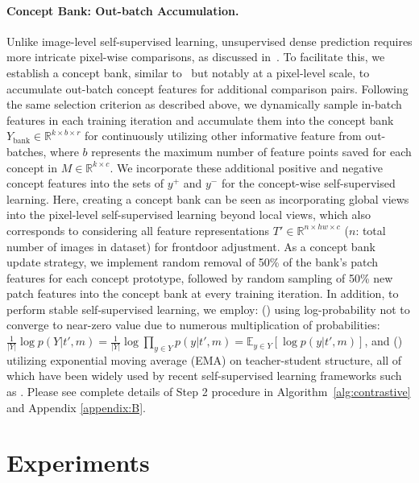 \documentclass{article} \usepackage{iclr2024_conference,times}
\newcommand{\E}{\mathbb{E}}
\begin{document}
\paragraph{Concept Bank: Out-batch Accumulation.} Unlike image-level self-supervised learning, unsupervised dense prediction requires more intricate pixel-wise comparisons, as discussed in~\citet{zhang2021looking}. To facilitate this, we establish a concept bank, similar to~\citet{he2020momentum} but notably at a pixel-level scale, to accumulate out-batch concept features for additional comparison pairs. Following the same selection criterion as described above, we dynamically sample in-batch features in each training iteration and accumulate them into the concept bank $Y_{\text{bank}}\in\mathbb{R}^{k\times b \times r}$ for continuously utilizing other informative feature from out-batches, where $b$ represents the maximum number of feature points saved for each concept in $M\in\mathbb{R}^{k\times c}$. We incorporate these additional positive and negative concept features into the sets of $y^{+}$ and $y^{-}$ for the concept-wise self-supervised learning. Here, creating a concept bank can be seen as incorporating global views into the pixel-level self-supervised learning beyond local views, which also corresponds to considering all feature representations $T'\in\mathbb{R}^{n\times hw\times c}$ ($n$: total number of images in dataset) for frontdoor adjustment. As a concept bank update strategy, we implement random removal of 50\% of the bank's patch features for each concept prototype, followed by random sampling of 50\% new patch features into the concept bank at every training iteration. In addition, to perform stable self-supervised learning, we employ: (\lowercase\expandafter{}) using log-probability not to converge to near-zero value due to numerous multiplication of probabilities: $\frac{1}{|Y|}\log p(Y|t', m){=}\frac{1}{|Y|}\log \prod_{y\in Y}p(y|t', m){=}\E_{y\in Y}[\log p(y|t', m)]$, and (\lowercase\expandafter{}) utilizing exponential moving average (EMA) on teacher-student structure, all of which have been widely used by recent self-supervised learning frameworks such as \citet{grill2020bootstrap, chen2021empirical, caron2021emerging, zhou2022image, assran2022masked}. Please see complete details of Step 2 procedure in Algorithm~\ref{alg:contrastive} and Appendix \ref{appendix:B}.

\section{Experiments}
\label{sec:experiment}
\vspace{-1.5mm}
\end{document}
